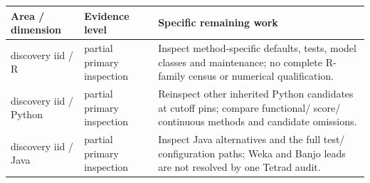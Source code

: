 \documentclass[
  10pt,
]{article}
\begin{document}
\begin{longtable}[]{@{}>{\raggedright\arraybackslash}p{}>{\raggedright\arraybackslash}p{}>{\raggedright\arraybackslash}p{}@{}}
\toprule
\begin{minipage}[b]{\linewidth}\raggedright
Area / dimension\strut
\end{minipage} & \begin{minipage}[b]{\linewidth}\raggedright
Evidence level\strut
\end{minipage} & \begin{minipage}[b]{\linewidth}\raggedright
Specific remaining work\strut
\end{minipage}\tabularnewline
\midrule
\endhead
\begin{minipage}[t]{\linewidth}\raggedright
discovery iid / R\strut
\end{minipage} & \begin{minipage}[t]{\linewidth}\raggedright
partial primary inspection\strut
\end{minipage} & \begin{minipage}[t]{\linewidth}\raggedright
Inspect method-specific defaults, tests, model classes and maintenance;
no complete R-family census or numerical qualification.\strut
\end{minipage}\tabularnewline
\begin{minipage}[t]{\linewidth}\raggedright
discovery iid / Python\strut
\end{minipage} & \begin{minipage}[t]{\linewidth}\raggedright
partial primary inspection\strut
\end{minipage} & \begin{minipage}[t]{\linewidth}\raggedright
Reinspect other inherited Python candidates at cutoff pins; compare
functional/ score/ continuous methods and candidate omissions.\strut
\end{minipage}\tabularnewline
\begin{minipage}[t]{\linewidth}\raggedright
discovery iid / Java\strut
\end{minipage} & \begin{minipage}[t]{\linewidth}\raggedright
partial primary inspection\strut
\end{minipage} & \begin{minipage}[t]{\linewidth}\raggedright
Inspect Java alternatives and the full test/ configuration paths; Weka
and Banjo leads are not resolved by one Tetrad audit.\strut

\end{minipage}
\end{longtable}
\end{document}
